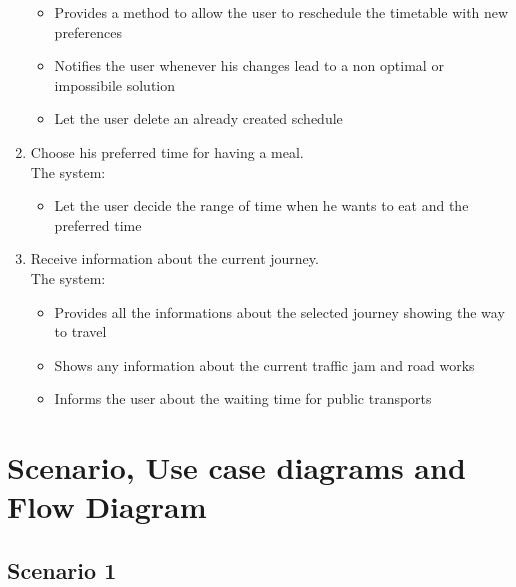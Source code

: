 \documentclass[numbers=noenddot, 12pt, a4paper, oneside]{scrbook}
\begin{document}
\begin{enumerate}
	\begin{itemize}
		\item Provides a method to allow the user to reschedule the timetable with new preferences
		\item Notifies the user whenever his changes lead to a non optimal or impossibile solution 
		\item Let the user delete an already created schedule
	\end{itemize}
	\item Choose his preferred time for having a meal.\\The system:
	\begin{itemize}
		\item Let the user decide the range of time when he wants to eat and the preferred time
	\end{itemize}
	\item Receive information about the current journey.\\The system:
	\begin{itemize}
		\item Provides all the informations about the selected journey showing the way to travel
		\item Shows any information about the current traffic jam and road works
		\item Informs the user about the waiting time for public transports
	\end{itemize}
\end{enumerate}
\newpage
\section*{Scenario, Use case diagrams and Flow Diagram}


\subsection*{Scenario 1}
\end{document}
